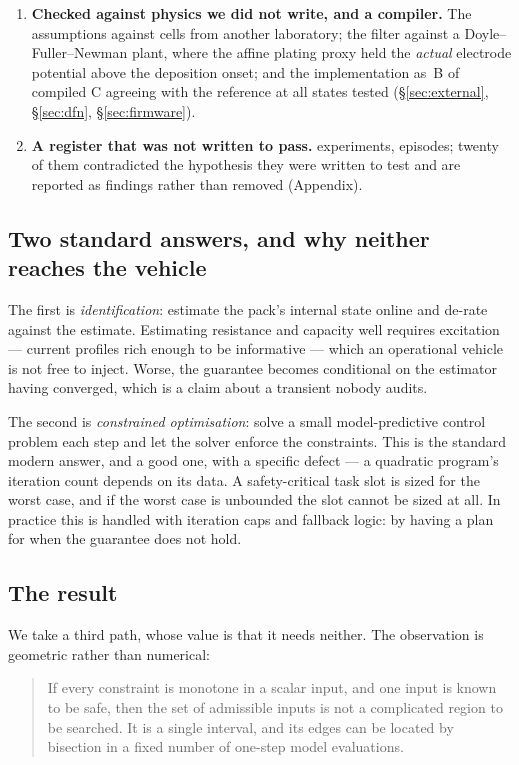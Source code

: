 \documentclass[11pt,letterpaper]{article}
\theoremstyle{definition}
\theoremstyle{remark}
\begin{document}
\begin{enumerate}
\item \textbf{Checked against physics we did not write, and a compiler.} The assumptions against
\nCells{} cells from another laboratory; the filter against a Doyle--Fuller--Newman plant, where
the affine plating proxy held the \emph{actual} electrode potential above the deposition onset;
and the implementation as \fwText\,B of compiled C agreeing with the reference at all
\fwStates{} states tested (\S\ref{sec:external}, \S\ref{sec:dfn}, \S\ref{sec:firmware}).

\item \textbf{A register that was not written to pass.} \vExperiments{} experiments,
\vTotalEpisodes{} episodes; twenty of them contradicted the hypothesis they were written to test
and are reported as findings rather than removed (Appendix).
\end{enumerate}

\subsection{Two standard answers, and why neither reaches the vehicle}

The first is \emph{identification}: estimate the pack's internal state online and de-rate against
the estimate. Estimating resistance and capacity well requires excitation --- current profiles
rich enough to be informative --- which an operational vehicle is not free to inject. Worse, the
guarantee becomes conditional on the estimator having converged, which is a claim about a
transient nobody audits.

The second is \emph{constrained optimisation}: solve a small model-predictive control problem
each step and let the solver enforce the constraints. This is the standard modern answer, and a
good one, with a specific defect --- a quadratic program's iteration count depends on its data.
A safety-critical task slot is sized for the worst case, and if the worst case is unbounded the
slot cannot be sized at all. In practice this is handled with iteration caps and fallback logic:
by having a plan for when the guarantee does not hold.

\subsection{The result}

We take a third path, whose value is that it needs neither. The observation is geometric rather
than numerical:

\begin{quote}
If every constraint is monotone in a scalar input, and one input is known to be safe, then the
set of admissible inputs is not a complicated region to be searched. It is a single interval,
and its edges can be located by bisection in a fixed number of one-step model evaluations.
\end{quote}
\end{document}
